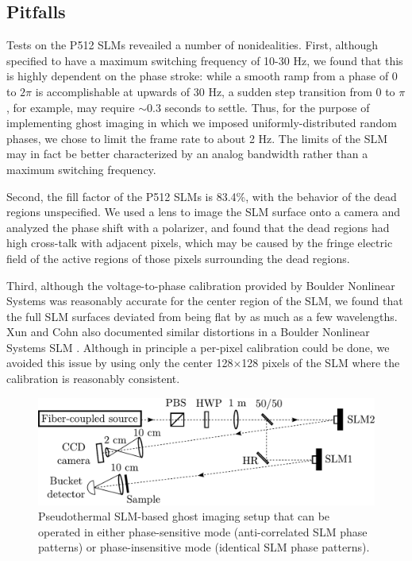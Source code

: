 \subsection{Pitfalls}
\label{subsection:pitfalls}
Tests on the P512 SLMs reveailed a number of nonidealities. First, although specified to have a maximum switching frequency of 10-30 Hz, we found that this is highly dependent on the phase stroke: while a smooth ramp from a phase of $0$ to $2\pi$ is accomplishable at upwards of 30 Hz, a sudden step transition from $0$ to $\pi$, for example, may require $\sim 0.3$ seconds to settle. Thus, for the purpose of implementing ghost imaging in which we imposed uniformly-distributed random phases, we chose to limit the frame rate to about 2 Hz. The limits of the SLM may in fact be better characterized by an analog bandwidth rather than a maximum switching frequency.

Second, the fill factor of the P512 SLMs is 83.4\%, with the behavior of the dead regions unspecified. We used a lens to image the SLM surface onto a camera and analyzed the phase shift with a polarizer, and found that the dead regions had high cross-talk with adjacent pixels, which may be caused by the fringe electric field of the active regions of those pixels surrounding the dead regions.

Third, although the voltage-to-phase calibration provided by Boulder Nonlinear Systems was reasonably accurate for the center region of the SLM, we found that the full SLM surfaces deviated from being flat by as much as a few wavelengths. Xun and Cohn also documented similar distortions in a Boulder Nonlinear Systems SLM \cite{xun-phase}. Although in principle a per-pixel calibration could be done, we avoided this issue by using only the center 128$\times$128 pixels of the SLM where the calibration is reasonably consistent.

\begin{figure}[t]
\begin{center}
\includegraphics[width=13cm]{figure-ghost-setup.pdf}
\caption{Pseudothermal SLM-based ghost imaging setup that can be operated in either phase-sensitive mode (anti-correlated SLM phase patterns) or phase-insensitive mode (identical SLM phase patterns).}
\label{figure:ghost-setup}
\end{center}
\end{figure}


